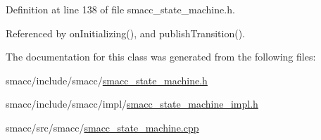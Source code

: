 Definition at line 138 of file smacc\+\_\+state\+\_\+machine.\+h.



Referenced by on\+Initializing(), and publish\+Transition().



The documentation for this class was generated from the following files\+:\begin{DoxyCompactItemize}
\item 
smacc/include/smacc/\hyperlink{smacc__state__machine_8h}{smacc\+\_\+state\+\_\+machine.\+h}\item 
smacc/include/smacc/impl/\hyperlink{smacc__state__machine__impl_8h}{smacc\+\_\+state\+\_\+machine\+\_\+impl.\+h}\item 
smacc/src/smacc/\hyperlink{smacc__state__machine_8cpp}{smacc\+\_\+state\+\_\+machine.\+cpp}\end{DoxyCompactItemize}
